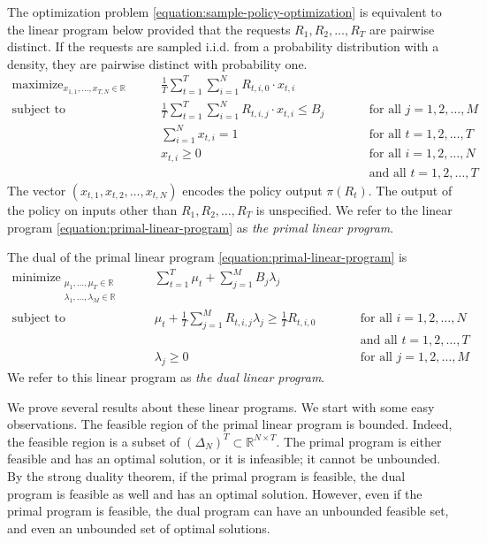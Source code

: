 \documentclass[12pt]{article}
\newcommand{\R}{\mathbb{R}}
\DeclareMathOperator*{\maximize}{maximize}
\DeclareMathOperator*{\minimize}{minimize}
\DeclareMathOperator*{\subjectto}{subject\ to}
\theoremstyle{definition}
\begin{document}
The optimization problem \eqref{equation:sample-policy-optimization} is
equivalent to the linear program below provided that the requests $R_1, R_2,
\dots, R_T$ are pairwise distinct. If the requests are sampled i.i.d. from a
probability distribution with a density, they are pairwise distinct with
probability one.
\begin{equation}
\label{equation:primal-linear-program}
\begin{aligned}
\maximize_{x_{1,1}, \dots, x_{T,N} \in \R} \qquad & \frac{1}{T} \sum_{t=1}^T \sum_{i=1}^N R_{t,i,0} \cdot x_{t,i} \\
\subjectto \qquad & \frac{1}{T} \sum_{t=1}^T \sum_{i=1}^N R_{t,i,j} \cdot x_{t,i} \le B_j && \qquad \text{for all $j=1,2,\dots,M$} \\
& \sum_{i=1}^N x_{t,i} = 1 && \qquad \text{for all $t=1,2,\dots,T$} \\
& x_{t,i} \ge 0 && \qquad \text{for all $i=1,2,\dots,N$} \\
& && \qquad \text{and all $t=1,2,\dots,T$}
\end{aligned}
\end{equation}
The vector $(x_{t,1}, x_{t,2}, \dots, x_{t,N})$ encodes the policy output
$\pi(R_t)$. The output of the policy on inputs other than $R_1, R_2, \dots, R_T$
is unspecified. We refer to the linear program
\eqref{equation:primal-linear-program} as \emph{the primal linear program}.

The dual of the primal linear program \eqref{equation:primal-linear-program} is
\begin{equation}
\label{equation:dual-linear-program}
\begin{aligned}
\minimize_{\substack{\mu_1, \dots, \mu_T \in \R \\ \lambda_1, \dots, \lambda_M \in \R}} \qquad & \sum_{t=1}^T \mu_t + \sum_{j=1}^M B_j \lambda_j \\
\subjectto \qquad
& \mu_t + \frac{1}{T} \sum_{j=1}^M R_{t,i,j} \lambda_j  \ge \frac{1}{T} R_{t,i,0} && \qquad \text{for all $i=1,2,\dots,N$} \\
& && \qquad \text{and all $t=1,2,\dots,T$} \\
& \lambda_j \ge 0 && \qquad \text{for all $j=1,2,\dots,M$}
\end{aligned}
\end{equation}
We refer to this linear program as \emph{the dual linear program}.

We prove several results about these linear programs. We start with some easy
observations. The feasible region of the primal linear program is bounded.
Indeed, the feasible region is a subset of $\left(\Delta_N\right)^T \subset
\R^{N \times T}$. The primal program is either feasible and has an optimal
solution, or it is infeasible; it cannot be unbounded. By the strong duality
theorem, if the primal program is feasible, the dual program is feasible as well
and has an optimal solution. However, even if the primal program is feasible,
the dual program can have an unbounded feasible set, and even an unbounded set
of optimal solutions.
\end{document}

